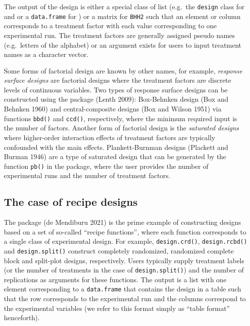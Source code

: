 The output of the design is either a special class of list (e.g.~the \texttt{design} class for  and  or a \texttt{data.frame} for ) or a matrix for \texttt{BHH2} such that an element or column corresponds to a treatment factor with each value corresponding to one experimental run. The treatment factors are generally assigned pseudo names (e.g.~letters of the alphabet) or an argument exists for users to input treatment names as a character vector.

Some forms of factorial design are known by other names, for example, \emph{response surface designs} are factorial designs where the treatment factors are discrete levels of continuous variables. Two types of response surface designs can be constructed using the  package (Lenth 2009): Box-Behnken design (Box and Behnken 1960) and central-composite designs (Box and Wilson 1951) via functions \texttt{bbd()} and \texttt{ccd()}, respectively, where the minimum required input is the number of factors. Another form of factorial design is the \emph{saturated designs} where higher-order interaction effects of treatment factors are typically confounded with the main effects. Plankett-Burnman designs (Plackett and Burman 1946) are a type of saturated design that can be generated by the function \texttt{pb()} in the  package, where the user provides the number of experimental runs and the number of treatment factors.

\hypertarget{the-case-of-recipe-designs}{%
\subsection{The case of recipe designs}\label{the-case-of-recipe-designs}}

The  package (de Mendiburu 2021) is the prime example of constructing designs based on a set of so-called ``recipe functions'', where each function corresponds to a single class of experimental design. For example, \texttt{design.crd()}, \texttt{design.rcbd()} and \texttt{design.split()} construct completely randomized, randomized complete block and split-plot designs, respectively. Users typically supply treatment labels (or the number of treatments in the case of \texttt{design.split()}) and the number of replications as arguments for these functions. The output is a list with one element corresponding to a \texttt{data.frame} that contains the design in a table such that the row corresponds to the experimental run and the columns correspond to the experimental variables (we refer to this format simply as ``table format'' henceforth).


